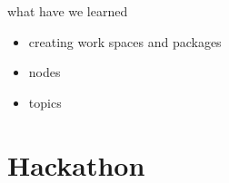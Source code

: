 \documentclass[xcolor=dvipsnames]{beamer}
\begin{document}
\begin{frame}{what have we learned}
\begin{itemize}
\item<1-> creating work spaces and packages
\item<2-> \color[rgb]{0.63,0.96,0.64} nodes
\item<3-> \color[rgb]{0.62,0.68,0.96} topics
\end{itemize}
\end{frame}

\section{Hackathon}
\end{document}
